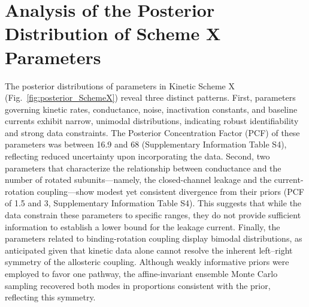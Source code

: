 \documentclass[pdflatex,sn-nature]{sn-jnl}%
\begin{document}
\section{Analysis of the Posterior Distribution of Scheme X Parameters}
The posterior distributions of parameters in Kinetic Scheme X (Fig.~\ref{fig:posterior_SchemeX}) reveal three distinct patterns. First, parameters governing kinetic rates, conductance, noise, inactivation constants, and baseline currents exhibit narrow, unimodal distributions, indicating robust identifiability and strong data constraints. The Posterior Concentration Factor (PCF) of these parameters was between 16.9 and 68 (Supplementary Information Table S4), reflecting reduced uncertainty upon incorporating
the data.
Second, two parameters that characterize the relationship between conductance and the number of rotated subunits—namely, the closed-channel leakage and the current-rotation coupling—show modest yet consistent divergence from their priors (PCF of 1.5 and 3, Supplementary Information Table S4). This suggests that while the data constrain these parameters to specific ranges, they do not provide sufficient information to establish a lower bound for the leakage current. Finally, the parameters related to binding-rotation coupling display bimodal distributions, as anticipated given that kinetic data alone cannot resolve the inherent left–right symmetry of the allosteric coupling. Although weakly informative priors were employed to favor one pathway, the affine-invariant ensemble Monte Carlo sampling recovered both modes in proportions consistent with the prior, reflecting this symmetry.
\end{document}
